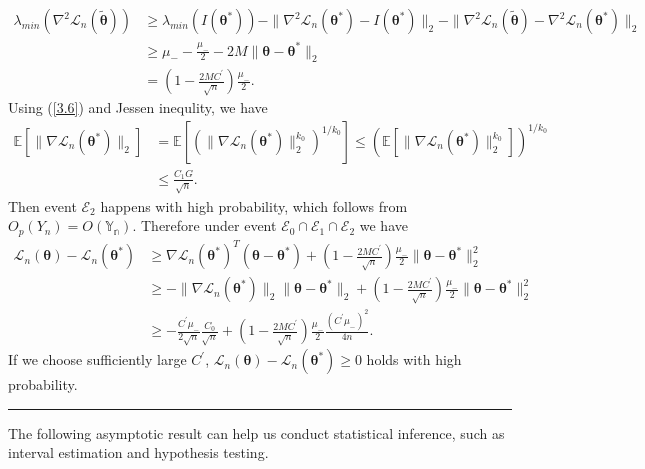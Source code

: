 \documentclass[12pt]{article}
\numberwithin{equation}{section}
\newenvironment{proof}{{\bf Proof:}}{\hfill\rule{2mm}{2mm}}
\begin{document}
\begin{proof}
	\begin{align*}
		\lambda_{min}\left(\nabla^2\mathcal{L}_n(\tilde{\boldsymbol{\theta}})\right)&\geq \lambda_{min}\left(I(\boldsymbol{\theta}^{*})\right)-\|\nabla^2\mathcal{L}_n(\boldsymbol{\theta}^{*})-I(\boldsymbol{\theta}^{*})\|_2-\|\nabla^2\mathcal{L}_n(\tilde{\boldsymbol{\theta}})-\nabla^2\mathcal{L}_n(\boldsymbol{\theta}^{*})\|_2\\
		&\geq \mu_{-}-\frac{\mu_{-}}{2}-2M\|\boldsymbol{\theta}-\boldsymbol{\theta}^{*}\|_2\\
		&= (1-\frac{2MC^{'}}{\sqrt{n}})\frac{\mu_{-}}{2}.
	\end{align*}
	Using (\ref{3.6}) and Jessen inequlity, we have
	\begin{align*}
		\mathbb{E}\left[\|\nabla\mathcal{L}_n(\boldsymbol{\theta}^{*})\|_2\right]&=\mathbb{E}\left[\left(\|\nabla\mathcal{L}_n(\boldsymbol{\theta}^{*})\|_2^{k_0}\right)^{1/k_0}\right]\leq \left(\mathbb{E}\left[\|\nabla\mathcal{L}_n(\boldsymbol{\theta}^{*})\|_2^{k_0}\right]\right)^{1/k_0}\\
		&\leq \frac{C_1G}{\sqrt{n}}.
	\end{align*}
	Then event $\mathcal{E}_2$ happens with high probability, which follows from $O_p(Y_n)=O(\mathbb{Y_n})$. Therefore under event $\mathcal{E}_0\cap \mathcal{E}_1\cap \mathcal{E}_2$ we have
	\begin{align*}
	\mathcal{L}_n\left(\boldsymbol{\theta}\right)-\mathcal{L}_n\left(\boldsymbol{\theta}^{*}\right)&\geq \nabla\mathcal{L}_n\left(\boldsymbol{\theta}^{*}\right)^T\left(\boldsymbol{\theta}-\boldsymbol{\theta}^{*}\right)+(1-\frac{2MC^{'}}{\sqrt{n}})\frac{\mu_{-}}{2}\|\boldsymbol{\theta}-\boldsymbol{\theta}^{*}\|_2^2\\
	&\geq -\|\nabla\mathcal{L}_n\left(\boldsymbol{\theta}^{*}\right)\|_2\|\boldsymbol{\theta}-\boldsymbol{\theta}^{*}\|_2+(1-\frac{2MC^{'}}{\sqrt{n}})\frac{\mu_{-}}{2}\|\boldsymbol{\theta}-\boldsymbol{\theta}^{*}\|_2^2\\
	&\geq -\frac{C^{'}\mu_{-}}{2\sqrt{n}}\frac{C_0}{\sqrt{n}}+(1-\frac{2MC^{'}}{\sqrt{n}})\frac{\mu_{-}}{2}\frac{(C^{'}\mu_{-})^2}{4n}.
	\end{align*}
	If we choose sufficiently large $C^{'}$, $\mathcal{L}_n\left(\boldsymbol{\theta}\right)-\mathcal{L}_n\left(\boldsymbol{\theta}^{*}\right)\geq 0$ holds with high probability.
\end{proof}\newline
The following asymptotic result can help us conduct statistical inference, such as interval estimation and hypothesis testing.
\end{document}
